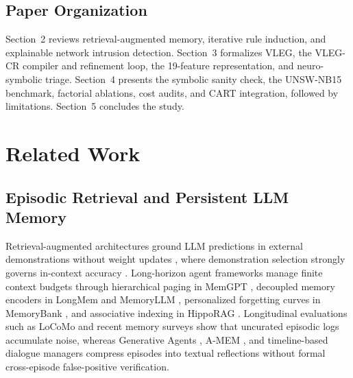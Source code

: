 \documentclass[11pt,letterpaper,onecolumn]{article}
\begin{document}
\subsection{Paper Organization}
Section~2 reviews retrieval-augmented memory, iterative rule induction, and explainable network intrusion detection. Section~3 formalizes VLEG, the VLEG-CR compiler and refinement loop, the 19-feature representation, and neuro-symbolic triage. Section~4 presents the symbolic sanity check, the UNSW-NB15 benchmark, factorial ablations, cost audits, and CART integration, followed by limitations. Section~5 concludes the study.

\section{Related Work}
\subsection{Episodic Retrieval and Persistent LLM Memory}
Retrieval-augmented architectures ground LLM predictions in external demonstrations without weight updates \cite{brown2020language,lewis2020retrieval}, where demonstration selection strongly governs in-context accuracy \cite{zhang2022active,purohit2025sample}. Long-horizon agent frameworks manage finite context budgets \cite{an2025why,liu2024lost} through hierarchical paging in MemGPT \cite{packer2023memgpt}, decoupled memory encoders in LongMem \cite{wang2023longmem} and MemoryLLM \cite{wang2024memoryllm}, personalized forgetting curves in MemoryBank \cite{zhong2024memorybank}, and associative indexing in HippoRAG \cite{gutierrez2024hipporag}. Longitudinal evaluations such as LoCoMo \cite{maharana2024evaluating} and recent memory surveys \cite{wu2025from,zhang2025survey} show that uncurated episodic logs accumulate noise, whereas Generative Agents \cite{park2023generative}, A-MEM \cite{xu2025amem}, and timeline-based dialogue managers \cite{kim2024towards} compress episodes into textual reflections without formal cross-episode false-positive verification.
\end{document}
